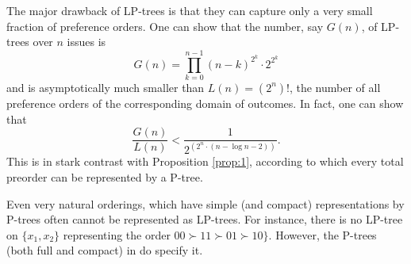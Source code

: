 The major drawback of LP-trees is that they can capture only a very small
fraction of preference orders. One can show that the number, say $G(n)$, 
of LP-trees over $n$ issues is 
\begin{equation*}
G(n)=\prod_{k=0}^{n-1} (n-k)^{2^k} \cdot 2^{2^k}
\end{equation*}
and is asymptotically much smaller than $L(n)=(2^n)!$, the number of all 
preference orders of the corresponding domain of outcomes. In fact, 
one can show that 
\[
\frac{G(n)}{L(n)} < \frac{1}{2^{(2^n \cdot (n-\log n -2))}}.
\]
This is in stark contrast with Proposition \ref{prop:1}, according
to which every total preorder can be represented by a P-tree.

Even very natural orderings, which have simple (and compact) representations
by P-trees often cannot be represented as LP-trees. For instance, there is 
no LP-tree on $\{x_1,x_2\}$ representing the order $00\succ 11 \succ 01 
\succ 10\}$. However, the P-trees (both full and compact) in 
do specify it.


